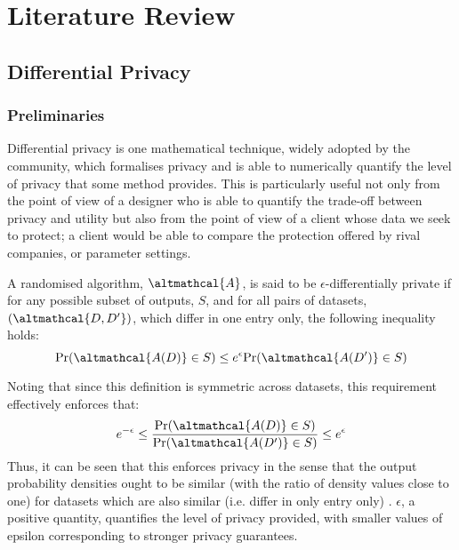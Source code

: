 
\chapter{Literature Review}
%
\graphicspath{{LitReview/Figs/}}

\section{Differential Privacy}
\subsection{Preliminaries}
Differential privacy is one mathematical technique, widely adopted by the community, which formalises privacy and is able to numerically quantify the level of privacy that some method provides. This is particularly useful not only from the point of view of a designer who is able to quantify the trade-off between privacy and utility but also from the point of view of a client whose data we seek to protect; a client would be able to compare the protection offered by rival companies, or parameter settings. 

\begin{definition}
	A randomised algorithm, $\altmathcal{A}$, is said to be $\epsilon$-differentially private if for any possible subset of outputs, $S$, and for all pairs of datasets, $(\altmathcal{D, D'})$, which differ in one entry only, the following inequality holds:
	\begin{equation}
	\text{Pr}(\altmathcal{A(D)} \in S) \leq e^\epsilon \text{Pr}(\altmathcal{A(D')} \in S) 
	\end{equation}
\end{definition}

Noting that since this definition is symmetric across datasets, this requirement effectively enforces that:
\begin{align}
e^{-\epsilon} \leq \frac{\text{Pr}(\altmathcal{A(D)} \in S)}{\text{Pr}(\altmathcal{A(D')} \in S)} \leq e^{\epsilon}
\end{align}
Thus, it can be seen that this enforces privacy in the sense that the output probability densities ought to be similar (with the ratio of density values close to one) for datasets which are also similar (i.e. differ in only entry only) \citep{foundations}. $\epsilon$, a positive quantity, quantifies the level of privacy provided, with smaller values of epsilon corresponding to stronger privacy guarantees.

